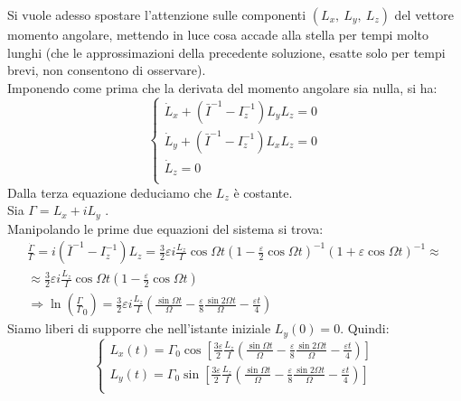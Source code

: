 \documentclass[../main.tex]{subfiles}
\begin{document}
Si vuole adesso spostare l'attenzione sulle componenti $(L_x, \ L_y, \ L_z)$ del vettore momento angolare, mettendo in luce cosa accade alla stella  per tempi molto lunghi (che le approssimazioni della precedente soluzione, esatte solo per tempi brevi, non consentono di osservare). \\
Imponendo come prima che la derivata del momento angolare sia nulla, si ha:
\begin{equation*}
\begin{cases}
	\displaystyle \dot L_x+(\bar I^{-1}-I_z^{-1}) L_yL_z=0\\
           \displaystyle \dot L_y+(\bar I^{-1}-I_z^{-1}) L_xL_z=0\\
           \displaystyle \dot L_z=0\\
\end{cases}
\end{equation*}
Dalla terza equazione deduciamo che $L_z$ è costante. \\
Sia $\Gamma=L_x+iL_y$ .\\
 Manipolando le prime due equazioni del sistema si trova: 
\begin{gather*}
	\displaystyle \frac{\dot\Gamma}\Gamma=i(\bar I^{-1}-I_z^{-1})L_z=
           \frac{3}{2}  \varepsilon i\frac{L_z}{I}\cos \Omega t\left (1-\frac \varepsilon 2 \cos\Omega t\right)^{-1} \left( 1+\varepsilon      \cos\Omega t\right)^{-1}\approx \\ \approx
           \frac{3}{2}  \varepsilon i\frac{L_z}{I}\cos \Omega t\left (1-\frac \varepsilon 2 \cos\Omega t\right) \\
            \Longrightarrow \ln\left(\frac{\Gamma}\Gamma_0\right)= \frac{3}{2}  \varepsilon i\frac{L_z}{I}\left (\frac{\sin \Omega t}{\Omega}- \frac{\varepsilon}{8} \frac{\sin 2 \Omega t}{\Omega}-\frac{\varepsilon t}{4}\right)
\end{gather*}
Siamo liberi di supporre che nell'istante iniziale $L_y(0)=0$. Quindi:
\begin{equation*}
\begin{cases}
		\displaystyle L_x(t)=\Gamma_0 \cos \left[\frac{3\varepsilon }{2} \frac{L_z}{I}\left (\frac{\sin \Omega t}{\Omega}- \frac{\varepsilon}{8} \frac{\sin 2 \Omega t}{\Omega}-\frac{\varepsilon t}{4}\right) \right] \\
                     \displaystyle L_y(t)=\Gamma_0 \sin \left[\frac{3\varepsilon }{2} \frac{L_z}{I}\left (\frac{\sin \Omega t}{\Omega}- \frac{\varepsilon}{8} \frac{\sin 2 \Omega t}{\Omega}-\frac{\varepsilon t}{4}\right) \right] \\
	\end{cases}
\end{equation*}
\end{document}
